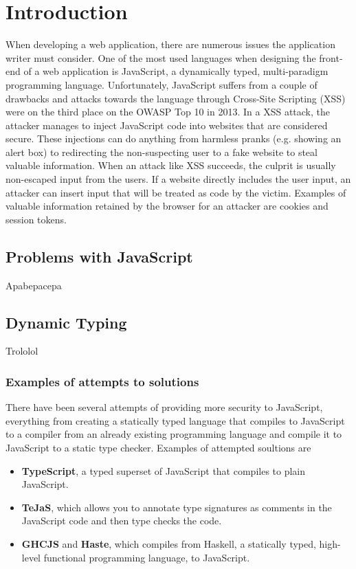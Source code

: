 \section{Introduction}
When developing a web application, there are numerous issues the application writer must consider. One of the most used languages when designing the front-end of a web application is JavaScript\cite{javascript_popularity}, a dynamically typed, multi-paradigm programming language.\cite{javascript_info} Unfortunately, JavaScript suffers from a couple of drawbacks and attacks towards the language through Cross-Site Scripting (XSS) were on the third place on the OWASP Top 10 in 2013.\cite{owasp_xss_rank} In a XSS attack, the attacker manages to inject JavaScript code into websites that are considered secure.\cite{owasp_xss, excess_xss} These injections can do anything from harmless pranks (e.g. showing an alert box) to redirecting the non-suspecting user to a fake website to steal valuable information. When an attack like XSS succeeds, the culprit is usually non-escaped input from the users. If a website directly includes the user input, an attacker can insert input that will be treated as code by the victim.\cite{excess_xss} Examples of valuable information retained by the browser for an attacker are cookies and session tokens.
\subsection{Problems with JavaScript}
Apabepacepa
\subsection{Dynamic Typing}
Trololol
\subsubsection{Examples of attempts to solutions}
There have been several attempts of providing more security to JavaScript, everything from creating a statically typed language that compiles to JavaScript to a compiler from an already existing programming language and compile it to JavaScript to a static type checker. Examples of attempted soultions are
\begin{itemize}
  \item \textbf{TypeScript}\cite{typescript}, a typed superset of JavaScript that compiles to plain JavaScript.
  \item \textbf{TeJaS}\cite{tejas-art,tejas-git}, which allows you to annotate type signatures as comments in the JavaScript code and then type checks the code.
  \item \textbf{GHCJS}\cite{ghcjs} and \textbf{Haste}\cite{haste-lang,haste-symposium}, which compiles from Haskell, a statically typed, high-level functional programming language\cite{haskell}, to JavaScript.
\end{itemize}

